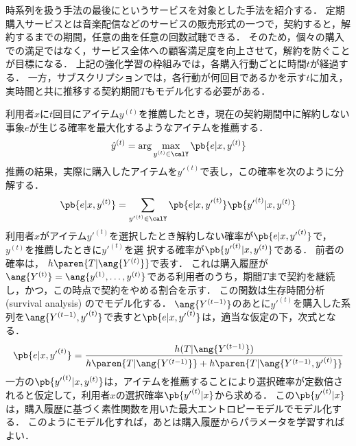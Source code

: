 時系列を扱う手法の最後にというサービスを対象とした手法を紹介する\cite{kdd:06:02}．
定期購入サービスとは音楽配信などのサービスの販売形式の一つで，契約すると，解約するまでの期間，任意の曲を任意の回数試聴できる．
そのため，個々の購入での満足ではなく，サービス全体への顧客満足度を向上させて，解約を防ぐことが目標になる．
上記の強化学習の枠組みでは，各購入行動ごとに時間$t$が経過する．
一方，サブスクリプションでは，各行動が何回目であるかを示す$t$に加え，実時間と共に推移する契約期間$T$もモデル化する必要がある．

利用者$x$に$t$回目にアイテム$y^{(t)}$を推薦したとき，現在の契約期間中に解約しない事象$e$が生じる確率を最大化するようなアイテムを推薦する．
\[
 \hat{y}^{(t)}=\arg\max_{y^{(t)}\in\calY}\pb{e|x,y^{(t)}}
\]
推薦の結果，実際に購入したアイテムを${y'}^{(t)}$で表し，この確率を次のように分解する．
\[
\pb{e|x,y^{(t)}}=
\sum_{{y'}^{(t)}\in\calY}
\pb{e|x,{y'}^{(t)}} \pb{{y'}^{(t)}|x,y^{(t)}}
\]
利用者$x$がアイテム${y'}^{(t)}$を選択したとき解約しない確率が$\pb{e|x,{y'}^{(t)}}$で，$y^{(t)}$を推薦したときに${y'}^{(t)}$を選
択する確率が$\pb{{y'}^{(t)}|x,y^{(t)}}$である．
前者の確率は， $h\paren{T|\ang{Y^{(t)}}}$で表す．
これは購入履歴が$\ang{Y^{(t)}}=\ang{y^{(1)},\ldots,y^{(t)}}$である利用者のうち，期間$T$まで契約を継続し，かつ，この時点で契約をやめる割合を示す．
この関数は生存時間分析 (survival analysis) のでモデル化する．
$\ang{Y^{(t-1)}}$のあとに${y'}^{(t)}$を購入した系列を$\ang{Y^{(t-1)},{y'}^{(t)}}$で表すと$\pb{e|x,{y'}^{(t)}}$は，適当な仮定の下，次式となる．
\[
\pb{e|x,{y'}^{(t)}}=
\frac{h(T|\ang{Y^{(t-1)}})}{h\paren{T|\ang{Y^{(t-1)}}}+h\paren{T|\ang{Y^{(t-1)},{y'}^{(t)}}}}
\]
一方の$\pb{{y'}^{(t)}|x,y^{(t)}}$は，アイテムを推薦することにより選択確率が定数倍されると仮定して，利用者$x$の選択確率$\pb{{y'}^{(t)}|x}$から求める．
この$\pb{{y'}^{(t)}|x}$は，購入履歴に基づく素性関数を用いた最大エントロピーモデルでモデル化する．
このようにモデル化すれば，あとは購入履歴からパラメータを学習すればよい．

